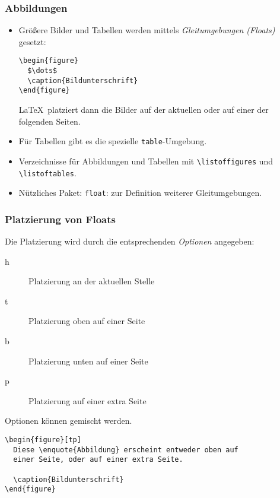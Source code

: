 \begin{frame}[fragile]
  \frametitle{Abbildungen}

  \begin{itemize}
  \item<+-> Größere Bilder und Tabellen werden mittels \emph{Gleitumgebungen (Floats)} gesetzt:
  \onslide<+->
\begin{lstlisting}
\begin{figure}
  $\dots$
  \caption{Bildunterschrift}
\end{figure}
\end{lstlisting}
  \onslide<+->
  \LaTeX\ platziert dann die Bilder auf der aktuellen oder auf einer der folgenden Seiten.

  \item<+-> Für Tabellen gibt es die spezielle \texttt{table}-Umgebung.
  \item<+-> Verzeichnisse für Abbildungen und Tabellen mit \lstinline!\listoffigures! und
    \lstinline!\listoftables!.
  \item<+-> Nützliches Paket: \lstinline!float!: zur Definition weiterer Gleitumgebungen.
  \end{itemize}

\end{frame}

\begin{frame}[fragile]
  \frametitle{Platzierung von Floats}

  \onslide<+->

  Die Platzierung wird durch die entsprechenden \textit{Optionen} angegeben:

  \onslide<+->

  \begin{description}
  \item[h] Platzierung an der aktuellen Stelle
  \item[t] Platzierung oben auf einer Seite
  \item[b] Platzierung unten auf einer Seite
  \item[p] Platzierung auf einer extra Seite
  \end{description}

  \onslide<+->

  Optionen können gemischt werden.

  \onslide<+->

\begin{lstlisting}
\begin{figure}[tp]
  Diese \enquote{Abbildung} erscheint entweder oben auf
  einer Seite, oder auf einer extra Seite.

  \caption{Bildunterschrift}
\end{figure}
\end{lstlisting}

\end{frame}

